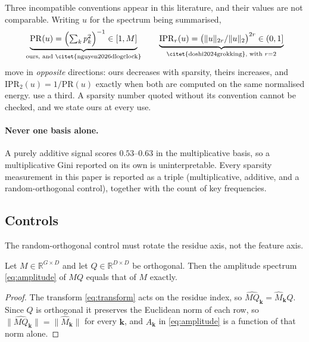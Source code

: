 Three incompatible conventions appear in this literature, and their values are not
comparable. Writing $u$ for the spectrum being summarised,
\begin{equation}
  \label{eq:conventions}
  \underbrace{\mathrm{PR}(u) = \Bigl(\textstyle\sum_{k} p_{k}^{2}\Bigr)^{-1} \in [1, M]}_{\text{ours, and \citet{nguyen2026dlogclock}}}
  \qquad
  \underbrace{\mathrm{IPR}_{r}(u) = \bigl( \lVert u \rVert_{2r} / \lVert u \rVert_{2} \bigr)^{2r} \in (0, 1]}_{\text{\citet{doshi2024grokking}, with } r = 2}
\end{equation}
move in \emph{opposite} directions: ours decreases with sparsity, theirs increases, and
$\mathrm{IPR}_{2}(u) = 1/\mathrm{PR}(u)$ exactly when both are computed on the same
normalised energy. \citet{nanda2023progress} use a third. A sparsity number quoted without its
convention cannot be checked, and we state ours at every use.

\paragraph{Never one basis alone.} A purely additive signal scores $0.53$--$0.63$ in the
multiplicative basis, so a multiplicative Gini reported on its own is uninterpretable. Every
sparsity measurement in this paper is reported as a triple (multiplicative, additive, and a
random-orthogonal control), together with the count of key frequencies.

\subsection{Controls}
\label{sec:methods-controls}

The random-orthogonal control must rotate the residue axis, not the feature axis.

\begin{proposition}
\label{prop:noop}
Let $M \in \mathbb{R}^{G \times D}$ and let $Q \in \mathbb{R}^{D \times D}$ be orthogonal.
Then the amplitude spectrum \eqref{eq:amplitude} of $MQ$ equals that of $M$ exactly.
\end{proposition}

\begin{proof}
The transform \eqref{eq:transform} acts on the residue index, so
$\widehat{MQ}_{\mathbf{k}} = \widehat{M}_{\mathbf{k}} Q$. Since $Q$ is orthogonal it preserves
the Euclidean norm of each row, so
$\lVert \widehat{MQ}_{\mathbf{k}} \rVert = \lVert \widehat{M}_{\mathbf{k}} \rVert$ for every
$\mathbf{k}$, and $A_{\mathbf{k}}$ in \eqref{eq:amplitude} is a function of that norm alone.
\end{proof}


